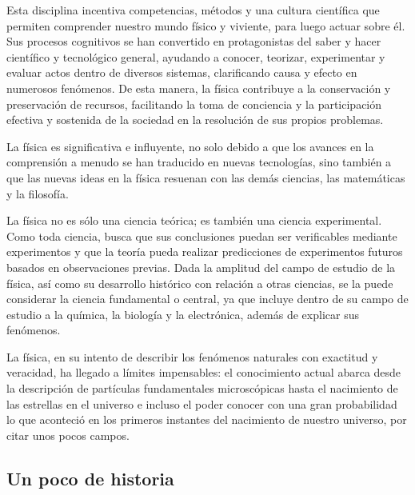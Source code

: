 Esta disciplina incentiva competencias, métodos y una cultura científica que permiten comprender nuestro mundo físico y viviente, para luego actuar sobre él. Sus procesos cognitivos se han convertido en protagonistas del saber y hacer científico y tecnológico general, ayudando a conocer, teorizar, experimentar y evaluar actos dentro de diversos sistemas, clarificando causa y efecto en numerosos fenómenos. De esta manera, la física contribuye a la conservación y preservación de recursos, facilitando la toma de conciencia y la participación efectiva y sostenida de la sociedad en la resolución de sus propios problemas.

La física es significativa e influyente, no solo debido a que los avances en la comprensión a menudo se han traducido en nuevas tecnologías, sino también a que las nuevas ideas en la física resuenan con las demás ciencias, las matemáticas y la filosofía.

La física no es sólo una ciencia teórica; es también una ciencia experimental. Como toda ciencia, busca que sus conclusiones puedan ser verificables mediante experimentos y que la teoría pueda realizar predicciones de experimentos futuros basados en observaciones previas. Dada la amplitud del campo de estudio de la física, así como su desarrollo histórico con relación a otras ciencias, se la puede considerar la ciencia fundamental o central, ya que incluye dentro de su campo de estudio a la química, la biología y la electrónica, además de explicar sus fenómenos. 

La física, en su intento de describir los fenómenos naturales con exactitud y veracidad, ha llegado a límites impensables: el conocimiento actual abarca desde la descripción de partículas fundamentales microscópicas hasta el nacimiento de las estrellas en el universo e incluso el poder conocer con una gran probabilidad lo que aconteció en los primeros instantes del nacimiento de nuestro universo, por citar unos pocos campos.

\subsection{Un poco de historia}

